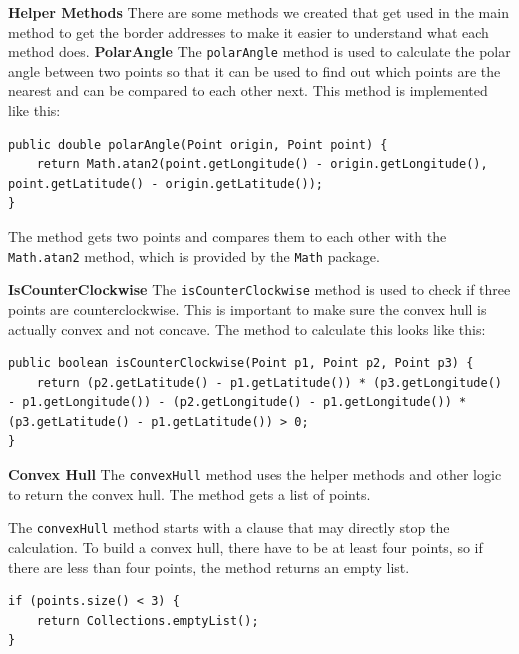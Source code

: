     \textbf{Helper Methods} \newline
    There are some methods we created that get used in the main method to get the border addresses to make it easier to understand what each method does. 
    \textbf{PolarAngle}
    The \texttt{polarAngle} method is used to calculate the polar angle between two points so that it can be used to find out which points are the nearest and can be compared to each other next. This method is implemented like this: 
    \lstset{style=java, caption=Polar Angle Method}
    \begin{verbatim}
public double polarAngle(Point origin, Point point) {
    return Math.atan2(point.getLongitude() - origin.getLongitude(), point.getLatitude() - origin.getLatitude());
}
    \end{verbatim}
    The method gets two points and compares them to each other with the \texttt{Math.atan2} method, which is provided by the \texttt{Math} package. \newline

    \textbf{IsCounterClockwise} \newline
    The \texttt{isCounterClockwise} method is used to check if three points are counterclockwise. This is important to make sure the convex hull is actually convex and not concave. The method to calculate this looks like this: 
    \lstset{style=java, caption=is Counter Clockwise Method}
    \begin{verbatim}
public boolean isCounterClockwise(Point p1, Point p2, Point p3) {
    return (p2.getLatitude() - p1.getLatitude()) * (p3.getLongitude() - p1.getLongitude()) - (p2.getLongitude() - p1.getLongitude()) * (p3.getLatitude() - p1.getLatitude()) > 0;
}
    \end{verbatim}

    \textbf{Convex Hull}
    The \texttt{convexHull} method uses the helper methods and other logic to return the convex hull. The method gets a list of points. \newline
    
    The \texttt{convexHull} method starts with a clause that may directly stop the calculation. To build a convex hull, there have to be at least four points, so if there are less than four points, the method returns an empty list.
    \lstset{style=java, caption=if Clause for Point Size}
    \begin{verbatim}
if (points.size() < 3) {
    return Collections.emptyList();
}
    \end{verbatim}
 
